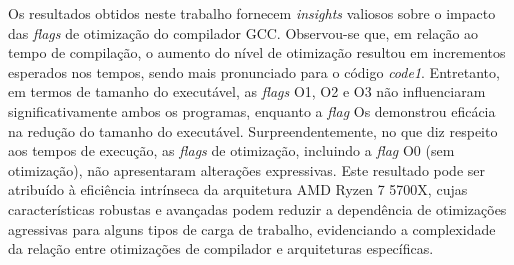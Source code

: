 \documentclass[12pt,a4paper]{article}
\begin{document}
Os resultados obtidos neste trabalho fornecem \textit{insights} valiosos sobre o impacto das \textit{flags} de otimização do compilador GCC. Observou-se que, em relação ao tempo de compilação, o aumento do nível de otimização resultou em incrementos esperados nos tempos, sendo mais pronunciado para o código \textit{code1}. Entretanto, em termos de tamanho do executável, as \textit{flags} O1, O2 e O3 não influenciaram significativamente ambos os programas, enquanto a \textit{flag} Os demonstrou eficácia na redução do tamanho do executável. Surpreendentemente, no que diz respeito aos tempos de execução, as \textit{flags} de otimização, incluindo a \textit{flag} O0 (sem otimização), não apresentaram alterações expressivas. Este resultado pode ser atribuído à eficiência intrínseca da arquitetura AMD Ryzen 7 5700X, cujas características robustas e avançadas podem reduzir a dependência de otimizações agressivas para alguns tipos de carga de trabalho, evidenciando a complexidade da relação entre otimizações de compilador e arquiteturas específicas.
\end{document}
